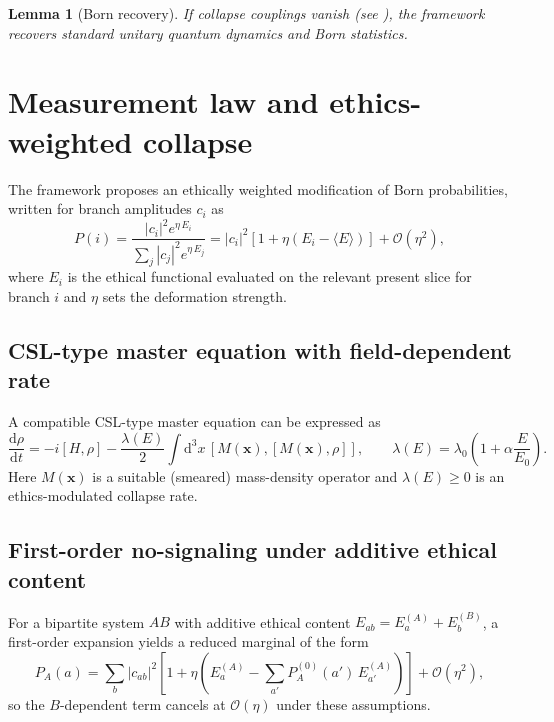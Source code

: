\documentclass[11pt]{article}
\newcommand{\Eth}{E}
\newcommand{\order}{\mathcal{O}}
\newcommand{\dd}{\mathrm{d}}
\newtheorem{lemma}{Lemma}
\begin{document}
\begin{lemma}[Born recovery]
If collapse couplings vanish (see ), the framework recovers standard unitary quantum
dynamics and Born statistics.
\end{lemma}

\section{Measurement law and ethics-weighted collapse}
\label{sec:collapse}
The framework proposes an ethically weighted modification of Born probabilities, written for
branch amplitudes $c_i$ as
\begin{equation}
P(i) =
\frac{|c_i|^2 e^{\eta\, \Eth_i}}{\sum_j |c_j|^2 e^{\eta\, \Eth_j}}
=
|c_i|^2\!\left[1+\eta\left(\Eth_i-\langle \Eth\rangle\right)\right]+\order(\eta^2),
\label{eq:born_deform}
\end{equation}
where $\Eth_i$ is the ethical functional evaluated on the relevant present slice for branch $i$ and $\eta$
sets the deformation strength.

\subsection{CSL-type master equation with field-dependent rate}
A compatible CSL-type master equation can be expressed as
\begin{equation}
\frac{\dd \rho}{\dd t}
=
-i[H,\rho]
-\frac{\lambda(\Eth)}{2}\int \dd^3x\,[M(\mathbf{x}),[M(\mathbf{x}),\rho]],
\qquad
\lambda(\Eth)=\lambda_0\!\left(1+\alpha \frac{\Eth}{\Eth_0}\right).
\label{eq:csl}
\end{equation}
Here $M(\mathbf{x})$ is a suitable (smeared) mass-density operator and $\lambda(\Eth)\ge 0$ is an
ethics-modulated collapse rate.

\subsection{First-order no-signaling under additive ethical content}
For a bipartite system $AB$ with additive ethical content $\Eth_{ab}=\Eth^{(A)}_a+\Eth^{(B)}_b$, a
first-order expansion yields a reduced marginal of the form
\begin{equation}
P_A(a)
=
\sum_b |c_{ab}|^2
\left[1+\eta\left(\Eth_a^{(A)} - \sum_{a'} P^{(0)}_A(a')\,\Eth_{a'}^{(A)}\right)\right]
+\order(\eta^2),
\label{eq:first_order_nosig}
\end{equation}
so the $B$-dependent term cancels at $\order(\eta)$ under these assumptions.
\end{document}
